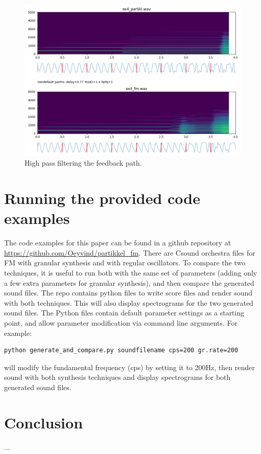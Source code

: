 \documentclass[runningheads,a4paper]{llncs}
\begin{document}
\begin{figure}
	\centering
	\includegraphics[width=.95\textwidth]{ex4_compare.png}
	\caption{High pass filtering the feedback path.}
	\label{fig:ex4}
\end{figure}

\section{Running the provided code examples}
The code examples for this paper can be found in a github repository at \url{https://github.com/Oeyvind/partikkel_fm}. There are Csound orchestra files for FM with granular synthesis and with regular oscillators. To compare the two techniques, it is useful to run both with the same set of parameters (adding only a few extra parameters for granular synthesis), and then compare the generated sound files. The repo contains python files to write score files and render sound with both techniques. This will also display spectrograms for the two generated sound files. The Python files contain default parameter settings as a starting point, and allow parameter modification via command line arguments. For example:
\begin{lstlisting}
python generate_and_compare.py soundfilename cps=200 gr.rate=200
\end{lstlisting}
will modify the fundamental frequency (cps) by setting it to 200Hz, then render sound with both synthesis techniques and display spectrograms for both generated sound files. 

\section{Conclusion}
...
\end{document}
